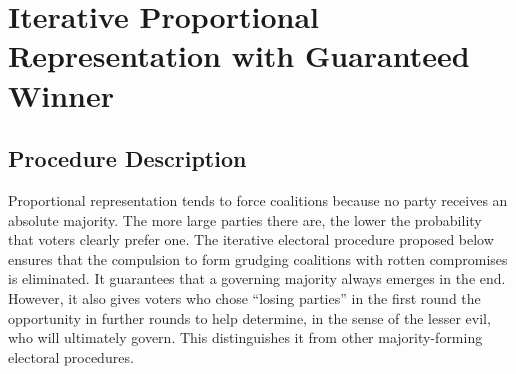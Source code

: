 \clearpage
\section{Iterative Proportional Representation with Guaranteed Winner}

\subsection{Procedure Description}

Proportional representation tends to force coalitions because no party receives an absolute
majority. The more large parties there are, the lower the probability that
voters clearly prefer one. The iterative electoral procedure proposed below ensures
that the compulsion to form grudging coalitions with rotten compromises is eliminated. It
guarantees that a governing majority always emerges in the end. However, it also gives
voters who chose \enquote{losing parties} in the first round the opportunity in further rounds
to help determine, in the sense of the lesser evil, who will ultimately govern. This
distinguishes it from other majority-forming electoral procedures.

